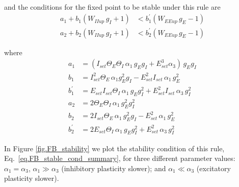 \documentclass[twocolumn]{article}
\newcommand{\EE}{\mathit{EE}}
\newcommand{\II}{\mathit{II}}
\newcommand{\set}{\mathit{set}}
\newcommand{\up}{\mathit{up}}
\begin{document}
\noindent and the conditions for the fixed point to be stable under this rule are
\begin{equation}
\begin{aligned}
a_1 + b_1(W_{\II\up} \, g_I + 1) & < b_1^\prime(W_{\EE\up} \, g_E - 1) \\
a_2 + b_2(W_{\II\up} \, g_I + 1) & < b_2^\prime(W_{\EE\up} \, g_E - 1)
\end{aligned}
\label{eq.FB_stable_cond_summary}
\end{equation}

\noindent where
\begin{displaymath}
\begin{aligned}
a_1 & = (I_{\set} \Theta_E \Theta_I \, \alpha_1 \, g_E g_I + E_{\set}^3 \alpha_3) \, g_E g_I \\
b_1 & = I_{\set}^2 \Theta_E \, \alpha_1 g_E^2 g_I - E_{\set}^2 I_{\set} \, \alpha_1 \, g_E^2 \\
b_1^\prime & = E_{\set} I_{\set} \Theta_I \, \alpha_1 \, g_E g_I^2 + E_{\set}^2 I_{\set} \, \alpha_3 \, g_I^2 \\
a_2 & = 2 \Theta_E \Theta_I \, \alpha_1 \, g_E^2 g_I^2 \\
b_2 & = 2I_{\set} \Theta_E \, \alpha_1 \, g_E^2 g_I - E_{\set}^2 \, \alpha_1 \, g_E^2 \\
b_2^\prime & = 2E_{\set} \Theta_I \, \alpha_1 \, g_E g_I^2 + E_{\set}^2 \, \alpha_3 \, g_I^2
\end{aligned}
\end{displaymath}


In Figure \ref{fig.FB_stability} we plot the stability condition of this rule, Eq.\ \ref{eq.FB_stable_cond_summary}, for three different parameter values: $\alpha_1 = \alpha_3$, $\alpha_1 \gg \alpha_3$ (inhibitory plasticity slower); and $\alpha_1 \ll \alpha_3$ (excitatory plasticity slower).
\end{document}
